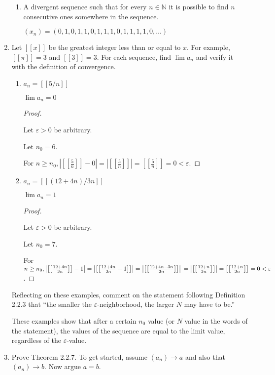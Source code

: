 \documentclass[12pt]{article}
\newcommand{\NN}{\mathbb{N}}
\newcommand\abs[1]{\left| #1 \right|} %
\newcommand\brac[1]{\left[ #1 \right]} %
\newcommand{\eps}{\varepsilon}
\begin{document}
\begin{enumerate}
\begin{enumerate}
\item A divergent sequence such that for every $n \in \NN$ it is possible to find $n$ consecutive ones somewhere in the sequence.

$(x_n) = (0, 1, 0, 1, 1, 0, 1, 1, 1, 0, 1, 1, 1, 1, 0, \dots)$
\end{enumerate}

\item Let $[[x]]$ be the greatest integer less than or equal to $x$. For example, $[[\pi]] = 3$ and $[[3]] = 3$. For each sequence, find $\lim a_n$ and verify it with the definition of convergence.
\begin{enumerate}
\item $a_n = [[5/n]]$

$\lim a_n = 0$

\begin{proof}
$ $

Let $\eps > 0$ be arbitrary.

Let $n_0 = 6$.

For $n \ge n_0, \abs{\brac{\brac{\frac{5}{n}}} - 0} = \abs{\brac{\brac{\frac{5}{n}}}} = \brac{\brac{\frac{5}{n}}} = 0 < \eps$.
\end{proof}

\item $a_n = [[(12 + 4n) / 3n]]$

$\lim a_n = 1$

\begin{proof}
$ $

Let $\eps > 0$ be arbitrary.

Let $n_0 = 7$.

For $n \ge n_0, \abs{\brac{\brac{\frac{12 + 4n}{3n}}} - 1} = \abs{\brac{\brac{\frac{12 + 4n}{3n} - 1}}} = \abs{\brac{\brac{\frac{12 + 4n - 3n}{3n}}}}
\\
= \abs{\brac{\brac{\frac{12 + n}{3n}}}} = \brac{\brac{\frac{12 + n}{3n}}} = 0 < \eps$.
\end{proof}
\end{enumerate}

Reflecting on these examples, comment on the statement following Definition 2.2.3 that ``the smaller the $\eps$-neighborhood, the larger $N$ may have to be.''

These examples show that after a certain $n_0$ value (or $N$ value in the words of the statement), the values of the sequence are equal to the limit value, regardless of the $\eps$-value.

\item Prove Theorem 2.2.7. To get started, assume $(a_n) \rightarrow a$ and also that
\\
$(a_n) \rightarrow b$. Now argue $a = b$.


\end{enumerate}
\end{document}
